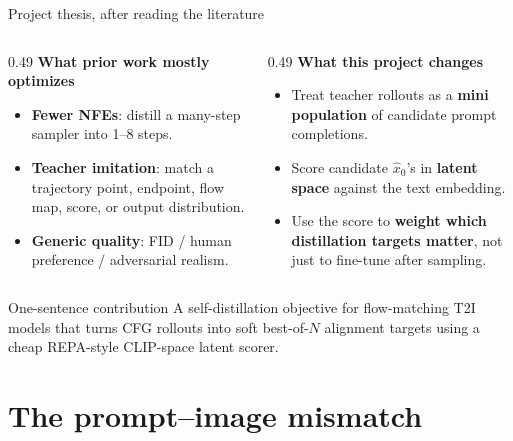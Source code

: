 \documentclass[aspectratio=169,10pt]{beamer}
\begin{document}
\begin{frame}{Project thesis, after reading the literature}
  \begin{columns}[T]
    \begin{column}{0.49\textwidth}
      \textbf{What prior work mostly optimizes}
      \begin{itemize}
        \item \textbf{Fewer NFEs}: distill a many-step sampler into 1--8 steps.
        \item \textbf{Teacher imitation}: match a trajectory point, endpoint,
          flow map, score, or output distribution.
        \item \textbf{Generic quality}: FID / human preference / adversarial
          realism.
      \end{itemize}
    \end{column}
    \begin{column}{0.49\textwidth}
      \textbf{What this project changes}
      \begin{itemize}
        \item Treat teacher rollouts as a \textbf{mini population} of candidate
          prompt completions.
        \item Score candidate \(\hat{x}_0\)'s in \textbf{latent space} against
          the text embedding.
        \item Use the score to \textbf{weight which distillation targets
          matter}, not just to fine-tune after sampling.
      \end{itemize}
    \end{column}
  \end{columns}
  \vspace{0.45em}
  \begin{alertblock}{One-sentence contribution}
    A self-distillation objective for flow-matching T2I models that turns CFG
    rollouts into soft best-of-\(N\) alignment targets using a cheap REPA-style
    CLIP-space latent scorer.
  \end{alertblock}
\end{frame}

\section{The prompt--image mismatch}
\end{document}
